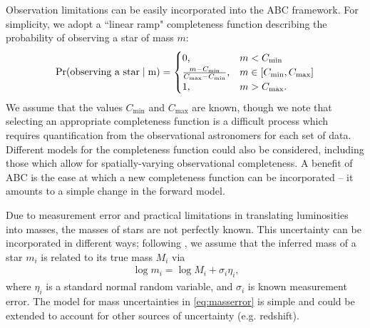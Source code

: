 \documentclass[ejs]{imsart}
\numberwithin{equation}{section}
\theoremstyle{plain}
\newcommand{\Proba}{\rm{Pr}}
\newcommand{\Cmin}{C_{\text{min}}}
\newcommand{\Cmax}{C_{\text{max}}}
\begin{document}
Observation limitations can be easily incorporated into the ABC framework.  For simplicity, we adopt a ``linear ramp" completeness function describing the probability of observing a star of mass $m$:
\begin{align}
	\Proba(\text{observing a star} \mid m) = \begin{cases} 0 \text{,} & m < \Cmin\\
								\frac{m - \Cmin}{\Cmax - \Cmin}\text{,} & m \in [\Cmin, \Cmax] \\
								1 \text{,} & m > \Cmax \text{.}
								\end{cases} \label{eq:ramp}
\end{align}
We assume that the values $\Cmin$ and $\Cmax$ are known, though we note that selecting an appropriate completeness function is a difficult process which requires quantification from the observational astronomers for each set of data.
Different models for the completeness function could also be considered, including those which allow for spatially-varying observational completeness.  A benefit of ABC is the ease at which a new completeness function can be incorporated -- it amounts to a simple change in the forward model.  

Due to measurement error and practical limitations in translating luminosities into masses, the masses of stars are not perfectly known. 
This uncertainty can be incorporated in different ways; following \cite{weisz13}, we assume that the inferred mass of a star $m_i$ is related to its true mass $M_i$ via 
\begin{align}
	\log m_i = \log M_i + \sigma_i \eta_i \text{,}
	\label{eq:masserror}
\end{align}
where $\eta_i$ is a standard normal random variable, and $\sigma_i$ is known measurement error.   %
The model for mass uncertainties in \eqref{eq:masserror} is simple and could be extended to account for other sources of uncertainty (e.g. redshift).
\end{document}
